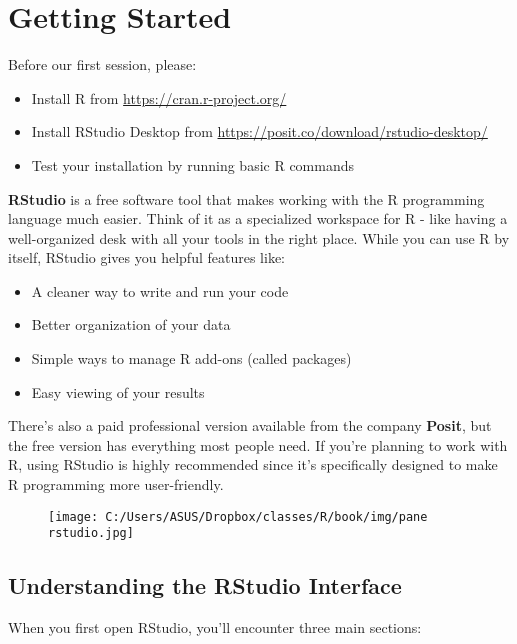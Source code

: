 \documentclass[
]{book}
\providecommand{\tightlist}{%
  \setlength{\itemsep}{0pt}\setlength{\parskip}{0pt}}
\begin{document}
\section{Getting Started}\label{getting-started}

Before our first session, please:

\begin{itemize}
\tightlist
\item
  Install R from \url{https://cran.r-project.org/}
\item
  Install RStudio Desktop from \url{https://posit.co/download/rstudio-desktop/}
\item
  Test your installation by running basic R commands
\end{itemize}

\textbf{RStudio} is a free software tool that makes working with the R programming language much easier. Think of it as a specialized workspace for R - like having a well-organized desk with all your tools in the right place. While you can use R by itself, RStudio gives you helpful features like:

\begin{itemize}
\tightlist
\item
  A cleaner way to write and run your code
\item
  Better organization of your data
\item
  Simple ways to manage R add-ons (called packages)
\item
  Easy viewing of your results
\end{itemize}

There's also a paid professional version available from the company \textbf{Posit}, but the free version has everything most people need. If you're planning to work with R, using RStudio is highly recommended since it's specifically designed to make R programming more user-friendly.

\begin{figure}
\centering
\texttt{[image: C:/Users/ASUS/Dropbox/classes/R/book/img/pane rstudio.jpg]}
\caption{\citet{EvaluationRCT2023}}
\end{figure}

\subsection{Understanding the RStudio Interface}\label{understanding-the-rstudio-interface}

When you first open RStudio, you'll encounter three main sections:
\end{document}
